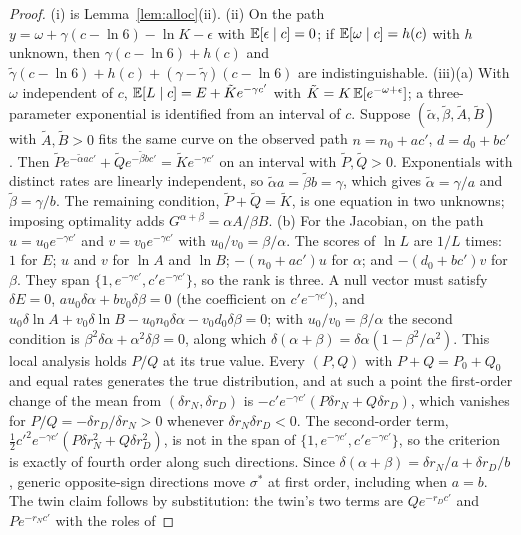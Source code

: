\begin{proof}
(i) is Lemma~\ref{lem:alloc}(ii). (ii) On the path $y=\omega+\gamma(c-\ln6)-\ln K-\epsilon$ with $\mathbb{E}[\epsilon\mid c]=0$;
if $\mathbb{E}[\omega\mid c]=h(c)$ with $h$ unknown, then $\gamma(c-\ln6)+h(c)$ and $\tilde\gamma(c-\ln6)+h(c)+(\gamma-\tilde\gamma)(c-\ln6)$
are indistinguishable. (iii)(a) With $\omega$ independent of $c$, $\mathbb{E}[L\mid c]=E+\tilde Ke^{-\gamma c'}$ with
$\tilde K=K\,\mathbb{E}[e^{-\omega+\epsilon}]$; a three-parameter exponential is identified from an interval of $c$. Suppose
$(\tilde\alpha,\tilde\beta,\tilde A,\tilde B)$ with $\tilde A,\tilde B>0$ fits the same curve on the observed path
$n=n_0+ac'$, $d=d_0+bc'$. Then $\tilde Pe^{-\tilde\alpha ac'}+\tilde Qe^{-\tilde\beta bc'}=\tilde Ke^{-\gamma c'}$ on an
interval with $\tilde P,\tilde Q>0$. Exponentials with distinct rates are linearly independent, so
$\tilde\alpha a=\tilde\beta b=\gamma$, which gives $\tilde\alpha=\gamma/a$ and $\tilde\beta=\gamma/b$. The remaining
condition, $\tilde P+\tilde Q=\tilde K$, is one equation in two unknowns; imposing optimality adds
$G^{\alpha+\beta}=\alpha A/\beta B$.
(b) For the Jacobian, on the path $u=u_0e^{-\gamma c'}$ and $v=v_0e^{-\gamma c'}$ with $u_0/v_0=\beta/\alpha$. The scores
of $\ln L$ are $1/L$ times: $1$ for $E$; $u$ and $v$ for $\ln A$ and $\ln B$; $-(n_0+ac')u$ for $\alpha$; and
$-(d_0+bc')v$ for $\beta$. They span $\{1,e^{-\gamma c'},c'e^{-\gamma c'}\}$, so the rank is three. A null vector must
satisfy $\delta E=0$, $au_0\delta\alpha+bv_0\delta\beta=0$ (the coefficient on $c'e^{-\gamma c'}$), and
$u_0\delta\ln A+v_0\delta\ln B-u_0n_0\delta\alpha-v_0d_0\delta\beta=0$; with $u_0/v_0=\beta/\alpha$ the second condition
is $\beta^2\delta\alpha+\alpha^2\delta\beta=0$, along which $\delta(\alpha+\beta)=\delta\alpha(1-\beta^2/\alpha^2)$. This
local analysis holds $P/Q$ at its true value. Every $(P,Q)$ with $P+Q=P_0+Q_0$ and equal rates generates the true
distribution, and at such a point the first-order change of the mean from $(\delta r_N,\delta r_D)$ is
$-c'e^{-\gamma c'}(P\delta r_N+Q\delta r_D)$, which vanishes for $P/Q=-\delta r_D/\delta r_N>0$ whenever
$\delta r_N\delta r_D<0$. The second-order term, $\tfrac12c'^2e^{-\gamma c'}(P\delta r_N^2+Q\delta r_D^2)$, is not in the span of
$\{1,e^{-\gamma c'},c'e^{-\gamma c'}\}$, so the criterion is exactly of fourth order along such directions. Since
$\delta(\alpha+\beta)=\delta r_N/a+\delta r_D/b$, generic opposite-sign directions move $\sigma^*$ at first order, including
when $a=b$. The twin claim follows by substitution: the twin's two terms are $Qe^{-r_Dc'}$ and $Pe^{-r_Nc'}$ with the roles of

\end{proof}
